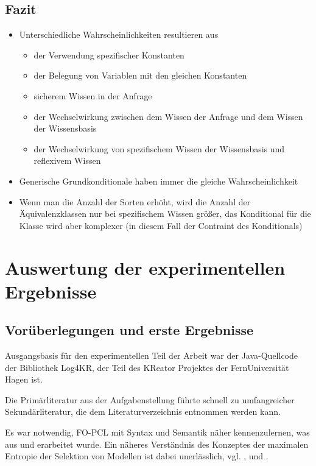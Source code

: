 \documentclass[a4paper, 11pt]{book}
\begin{document}
	\section{Fazit}
		\begin{itemize}
	\item Unterschiedliche Wahrscheinlichkeiten resultieren aus
	\begin{itemize}
		\item der Verwendung spezifischer Konstanten 
		\item der Belegung von Variablen mit den gleichen Konstanten
		\item sicherem Wissen in der Anfrage
		\item der Wechselwirkung zwischen dem Wissen der Anfrage und dem Wissen der Wissensbasis
		\item der Wechselwirkung von spezifischem Wissen der Wissensbasis und reflexivem Wissen
		\end{itemize}
	\item Generische Grundkonditionale haben immer die gleiche Wahrscheinlichkeit
	\item Wenn man die Anzahl der Sorten erhöht, wird die Anzahl der Äquivalenzklassen  nur bei spezifischem Wissen größer, das Konditional für die Klasse wird aber komplexer (in diesem Fall der Contraint des Konditionals)
\end{itemize}


 

\chapter{Auswertung der experimentellen Ergebnisse}\label{Beob}

\section{Vorüberlegungen und erste Ergebnisse}
Ausgangsbasis für den experimentellen Teil der Arbeit war der Java-Quellcode der Bibliothek Log4KR, der Teil des KReator Projektes der FernUniversität Hagen ist.

Die Primärliteratur aus der Aufgabenstellung \cite{Fis10} führte schnell zu umfangreicher Sekundärliteratur, die dem Literaturverzeichnis entnommen werden kann.

Es war notwendig, FO-PCL mit Syntax und Semantik näher kennenzulernen, was aus \cite{Fis10} und \cite{Fis12} erarbeitet wurde. Ein näheres Verständnis des Konzeptes der maximalen Entropie der Selektion von Modellen ist dabei unerlässlich, vgl. \cite{RKI97}, \cite{BKI08} und \cite{TFLKIB10}.
\end{document}
